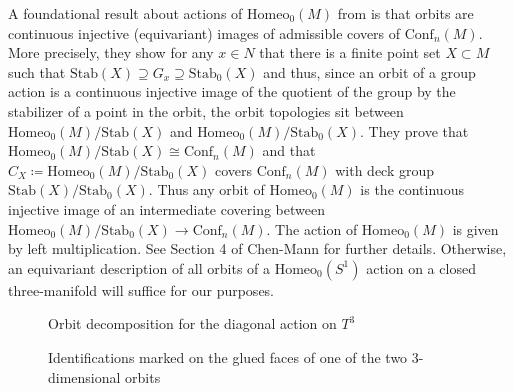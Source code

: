 \documentclass[10pt, oneside]{article}
\newcommand{\homeo}[1][S^1]{\text{Homeo}_0(#1)}
\newcommand{\conf}[2][S^1]{\text{Conf}_{#2}(#1)}
\newcommand{\stab}[1]{\text{Stab}(#1)}
\newcommand{\pstab}[1]{\text{Stab}_0(#1)}
\theoremstyle{definition}
\theoremstyle{definition}
\begin{document}
A foundational result about actions of $\homeo[M]$ from \cite{chen:StructureTheorems} is that orbits are continuous injective (equivariant) images of admissible covers of $\conf[M]{n}$. More precisely, they show for any $x\in N$ that there is a finite point set $X\subset M$ such that $\stab{X}\supseteq G_x \supseteq \pstab{X}$ and thus, since an orbit of a group action is a continuous injective image of the quotient of the group by the stabilizer of a point in the orbit, the orbit topologies sit between $\homeo[M]/\stab{X}$ and $\homeo[M]/\pstab{X}$. They prove that $\homeo[M]/\stab{X}\cong \conf[M]{n}$ and that $C_X\coloneqq \homeo[M]/\pstab{X}$ covers $\conf[M]{n}$ with deck group $\stab{X}/\pstab{X}$. Thus any orbit of $\homeo[M]$ is the continuous injective image of an intermediate covering between $\homeo[M]/\pstab{X}\to \conf[M]{n}$. The action of $\homeo[M]$ is given by left multiplication. See Section 4 of Chen-Mann\cite{chen:StructureTheorems} for further details. Otherwise, an equivariant description of all orbits of a $\homeo$ action on a closed three-manifold will suffice for our purposes.

\begin{figure}
    \begin{minipage}{.49\textwidth}
        \centering
        
        \caption{Orbit decomposition for the diagonal action on $T^3$}
        \label{fig:3torusdiagonalaction}
    \end{minipage}\hfill
    \begin{minipage}{.49\textwidth}
        \centering
        
        \caption{Identifications marked on the glued faces of one of the two 3-dimensional orbits}
        \label{fig:3dorbitidentifications}
    \end{minipage}
\end{figure}
\end{document}
